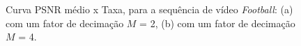 \begin{figure}[H]
	\centering
	\caption{Curva PSNR médio x Taxa, para a sequência de vídeo \textit{Football}: (a) com um fator de decimação $M$ = 2, (b) com um fator de decimação $M$ = 4.}
	\label{fig:footballh264}
\end{figure}


